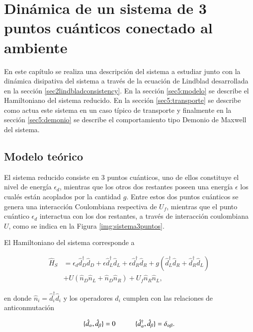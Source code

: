 \chapter{Dinámica de un sistema de 3 puntos cuánticos conectado al ambiente}
En este capítulo se realiza una descripción del sistema a estudiar junto con la dinámica disipativa del sistema a través de la ecuación de Lindblad desarrollada en la sección \ref{sec2lindbladconsistency}. En la sección \ref{sec5:modelo} se describe el Hamiltoniano del sistema reducido.  En la sección \ref{sec5:transporte} se describe como actua este sistema en un caso típico de transporte y finalmente en la sección \ref{sec5:demonio} se describe el comportamiento tipo Demonio de Maxwell del sistema.

\section{Modelo teórico}
El sistema reducido consiste en 3 puntos cuánticos, uno de ellos constituye el nivel de energía $\epsilon_{d}$, mientras que los otros dos restantes poseen una energía $\epsilon$ los cualés están acoplados por la cantidad $g$. Entre estos dos puntos cuánticos se genera una interacción Coulombiana respectiva de $U_{f}$, mientras que el punto cuántico $\epsilon_{d}$ interactua con los dos restantes, a través de interacción coulombiana $U$, como se indica en la Figura \ref{img:sistema3puntos}.



El Hamiltoniano del sistema corresponde a 

\begin{align*}
    \hat{H}_{S} & = \epsilon_{d}\hat{d}^{\dagger}_{D}\hat{d}_{D} + \epsilon \hat{d}^{\dagger}_{L}\hat{d}_{L} + \epsilon \hat{d}^{\dagger}_{R}\hat{d}_{R} + g(\hat{d}^{\dagger}_{L}\hat{d}_{R} + \hat{d}^{\dagger}_{R}\hat{d}_{L} ) \\
          & + U(\hat{n}_{D}\hat{n}_{L} + \hat{n}_{D}\hat{n}_{R} )  + U_{f}\hat{n}_{R}\hat{n}_{L},
\end{align*}

en donde $\hat{n}_{i} = \hat{d}^{\dagger}_{i} \hat{d}_{i}$ y los operadores $\hat{d}_{i}$ cumplen con las relaciones de anticonmutación

\begin{equation*}
    \{\hat{d}_{\alpha},\hat{d}_{\beta} \} = 0  \hspace{10mm} \{\hat{d}^{\dagger}_{\alpha}, \hat{d}_{\beta} \} = \delta_{\alpha \beta}.
\end{equation*}

